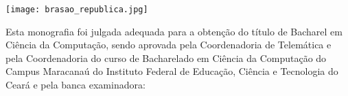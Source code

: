 \begin{folhadeaprovacao}

    \begin{center}
    \texttt{[image: brasao\_republica.jpg]} \\
    \vspace{.5cm}
    {\ABNTEXchapterfont\large\imprimirinstituicao}
    \vspace{1cm}

    {\ABNTEXchapterfont\large\imprimirautor}

    
   \end{center}
   Esta monografia foi julgada adequada para a obtenção do título de Bacharel em Ciência da Computação, sendo aprovada pela Coordenadoria de Telemática e pela Coordenadoria do curso de Bacharelado em Ciência da Computação do Campus Maracanaú do Instituto Federal de Educação, Ciência e Tecnologia do Ceará e pela banca examinadora:

\vfill

  \begin{center}
  \begin{minipage}{10cm}

   \if \imprimircoorientador
    
   \else
   \fi

   \if \nomeprofessorA \instituicaoprofessorA
    
   \else
    \assinatura{\textbf{\imprimirnomeprofessorA}  \\ \imprimirinstituicaoprofessorA}
   \fi


\end{minipage}
\end{center}
\end{folhadeaprovacao}
